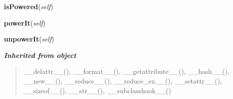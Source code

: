     \label{weapon_module_WIP:Weapon:isPowered}

    \vspace{0.5ex}

\hspace{.8\funcindent}\begin{boxedminipage}{\funcwidth}

    \raggedright \textbf{isPowered}(\textit{self})

\setlength{\parskip}{2ex}
\setlength{\parskip}{1ex}
    \end{boxedminipage}

    \label{weapon_module_WIP:Weapon:powerIt}

    \vspace{0.5ex}

\hspace{.8\funcindent}\begin{boxedminipage}{\funcwidth}

    \raggedright \textbf{powerIt}(\textit{self})

\setlength{\parskip}{2ex}
\setlength{\parskip}{1ex}
    \end{boxedminipage}

    \label{weapon_module_WIP:Weapon:unpowerIt}

    \vspace{0.5ex}

\hspace{.8\funcindent}\begin{boxedminipage}{\funcwidth}

    \raggedright \textbf{unpowerIt}(\textit{self})

\setlength{\parskip}{2ex}
\setlength{\parskip}{1ex}
    \end{boxedminipage}


\large{\textbf{\textit{Inherited from object}}}

\begin{quote}
\_\_delattr\_\_(), \_\_format\_\_(), \_\_getattribute\_\_(), \_\_hash\_\_(), \_\_new\_\_(), \_\_reduce\_\_(), \_\_reduce\_ex\_\_(), \_\_setattr\_\_(), \_\_sizeof\_\_(), \_\_str\_\_(), \_\_subclasshook\_\_()
\end{quote}

